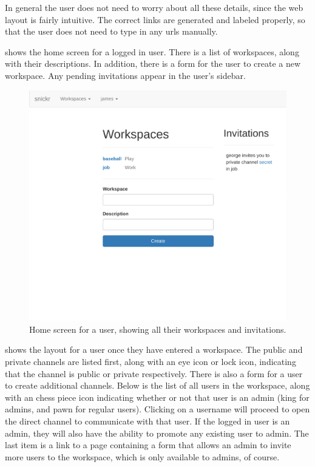\documentclass{article}
\begin{document}
In general the user does not need to worry about all these details, since the web layout is fairly intuitive. The correct links are generated and labeled properly, so that the user does not need to type in any urls manually.

 shows the home screen for a logged in user. There is a list of workspaces, along with their descriptions. In addition, there is a form for the user to create a new workspace. Any pending invitations appear in the user's sidebar.

\begin{figure}[!ht]
       \centering
       \includegraphics[width=0.9\linewidth]{workspaces}
       \caption{Home screen for a user, showing all their workspaces and invitations.}
       \label{fig:workspaces}
\end{figure}

 shows the layout for a user once they have entered a workspace. The public and private channels are listed first, along with an eye icon or lock icon, indicating that the channel is public or private respectively. There is also a form for a user to create additional channels. Below is the list of all users in the workspace, along with an chess piece icon indicating whether or not that user is an admin (king for admins, and pawn for regular users). Clicking on a username will proceed to open the direct channel to communicate with that user. If the logged in user is an admin, they will also have the ability to promote any existing user to admin. The last item is a link to a page containing a form that allows an admin to invite more users to the workspace, which is only available to admins, of course.
\end{document}
